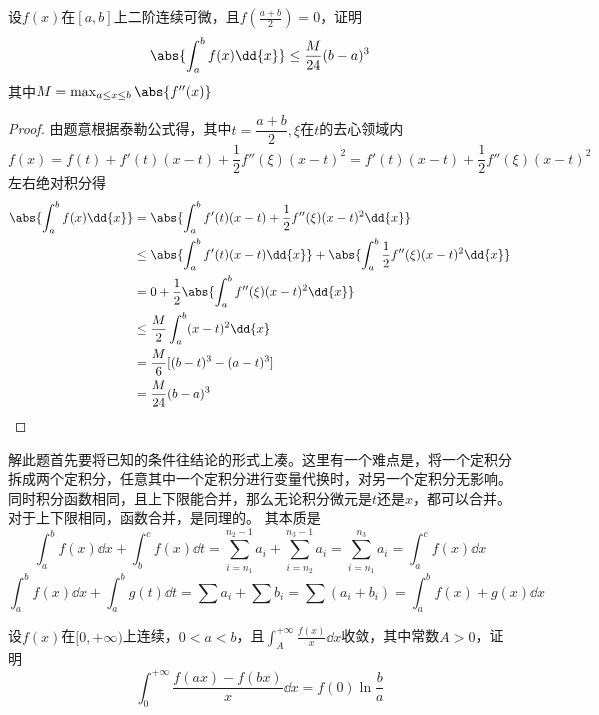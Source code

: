 \begin{example}
    设$f(x)$在$[a,b]$上二阶连续可微，且$\displaystyle f\left(\frac{a+b}{2}\right)=0$，证明
    \[ \abs{\int_a^bf(x)\dd{x}} \leq \frac{M}{24}(b-a)^3  \]
    其中$M=\max_{a\leq x \leq b}\abs{f''(x)}$
\end{example}
\begin{proof}
    由题意根据泰勒公式得，其中$t=\dfrac{a+b}{2},\xi $在$t$的去心领域内
    \[
        f(x)  = f(t) + f'(t)(x-t)+ \frac{1}{2}f''(\xi)(x-t)^2
        = f'(t)(x-t) + \frac{1}{2}f''(\xi)(x-t)^2
    \]
    左右绝对积分得
    \begin{align*}
        \abs{\int_a^bf(x)\dd{x}}
         & = \abs{\int_a^bf'(t)(x-t) + \frac{1}{2}f''(\xi)(x-t)^2\dd{x}}                          \\
         & \leq \abs{\int_a^b f'(t)(x-t)\dd{x}} + \abs{\int_a^b \frac{1}{2}f''(\xi)(x-t)^2\dd{x}} \\
         & = 0 + \frac{1}{2}\abs{\int_a^b f''(\xi)(x-t)^2\dd{x}}                                  \\
         & \leq \frac{M}{2}\int_a^b (x-t)^2\dd{x}                                                 \\
         & =\frac{M}{6}[(b-t)^3 - (a-t)^3]                                                        \\
         & =\frac{M}{24}(b-a)^3
    \end{align*}
\end{proof}
解此题首先要将已知的条件往结论的形式上凑。这里有一个难点是，将一个定积分拆成两个定积分，任意其中一个定积分进行变量代换时，对另一个定积分无影响。
同时积分函数相同，且上下限能合并，那么无论积分微元是$t$还是$x$，都可以合并。对于上下限相同，函数合并，是同理的。
其本质是
\[
    \int_a^b f(x)\dd{x} + \int_b^c f(x)\dd{t}
    =
    \sum_{i=n_1}^{n_2-1} a_i + \sum_{i=n_2}^{n_3-1} a_i
    =
    \sum_{i=n_1}^{n_3} a_i = \int_a^c f(x)\dd{x}
\]
\[
    \int_a^b f(x)\dd{x} + \int_a^b g(t)\dd{t}
    =
    \sum a_i + \sum b_i = \sum (a_i + b_i)
    =
    \int_a^b f(x)+g(x)\dd{x}
\]
\begin{example}
    设$f(x)$在$[0,+\infty)$上连续，$0<a<b$，且$\displaystyle\int_A^{+\infty}\frac{f(x)}{x}\dd{x}$收敛，其中常数$A>0$，证明
    \[
        \int_0^{+\infty}\frac{f(ax)-f(bx)}{x}\dd{x} = f(0)\ln\frac{b}{a}
    \]
\end{example}
